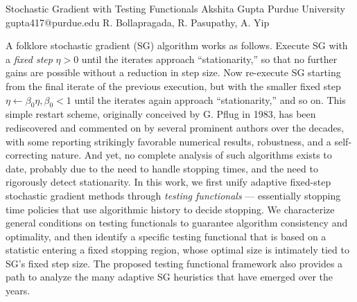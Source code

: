 \begin{talk}
  {Stochastic Gradient with Testing Functionals}%
  {Akshita Gupta}%
  {Purdue University}%
  {gupta417@purdue.edu}%
  {R. Bollapragada, R. Pasupathy, A. Yip}%
  
    
   
A folklore stochastic gradient (SG) algorithm works as follows. Execute SG with a \emph{fixed step} $\eta >0$ until the iterates approach ``stationarity,'' so that no further gains are possible without a reduction in step size. Now re-execute SG starting from the final iterate of the previous execution, but with the smaller fixed step  $\eta \leftarrow \beta_0\eta, \beta_0 <1$ until the iterates again approach ``stationarity,'' and so on. This simple restart scheme, originally conceived by G. Pflug in 1983, has been rediscovered and commented on by several prominent authors over the decades, with some reporting strikingly favorable numerical results, robustness, and a self-correcting nature. And yet, no complete analysis of such algorithms exists to date, probably due to the need to handle stopping times, and the need to rigorously detect stationarity. In this work, we first unify adaptive fixed-step stochastic gradient methods through \emph{testing functionals} --- essentially stopping time policies that use algorithmic history to decide stopping. We characterize general conditions on testing functionals to guarantee algorithm consistency and optimality, and then identify a specific testing functional that is based on a statistic entering a fixed stopping region, whose optimal size is intimately tied to SG's fixed step size. The proposed testing functional framework also provides a path to analyze the many adaptive SG heuristics that have emerged over the years.

\medskip




\end{talk}
